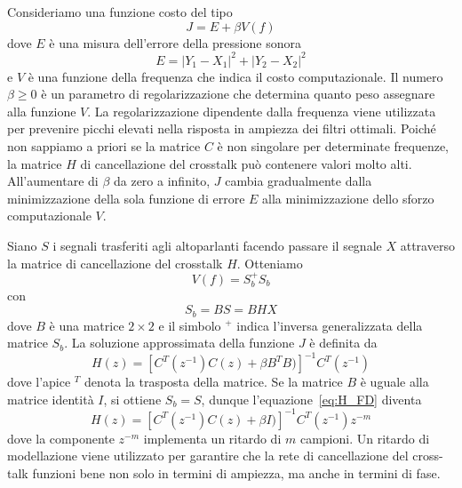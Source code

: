 \documentclass[12pt,a4paper,titlepage]{article}
\begin{document}
Consideriamo una funzione costo del tipo
\begin{equation}\label{funzione_costo_fd}
J = E + \beta V(f)
\end{equation}
dove $E$ è una misura dell'errore della pressione sonora
\begin{equation}\label{errore_fd}
E = | Y_1 - X_1 |^2  + | Y_2 - X_2 |^2
\end{equation}
e $V$ è una funzione della frequenza che indica il costo computazionale. Il numero $\beta \geq 0$ è un parametro di regolarizzazione che determina quanto peso
assegnare alla funzione $V$. La regolarizzazione dipendente dalla frequenza viene utilizzata per prevenire picchi elevati nella risposta in ampiezza dei filtri ottimali. Poiché non sappiamo a priori se la matrice $C$ è non singolare per determinate frequenze, la matrice $H$ di cancellazione del crosstalk può contenere valori molto alti. All'aumentare di $\beta$ da zero a infinito, $J$ cambia gradualmente dalla minimizzazione della sola funzione di errore $E$ alla minimizzazione dello sforzo computazionale $V$.

Siano $S$ i segnali trasferiti agli altoparlanti facendo passare il segnale $X$ attraverso la matrice di cancellazione del crosstalk $H$. Otteniamo
\begin{equation}
V(f) = S_b ^{+} S_b
\end{equation}
con
\begin{equation}
S_b = BS = BHX
\end{equation}
dove $B$ è una matrice $2 \times 2$ e il simbolo $^+$ indica l'inversa generalizzata della matrice $S_b$. La soluzione approssimata della funzione $J$ è definita da 
\begin{equation}\label{eq:H_FD}
H(z) = \left[C^T (z^{-1}) C(z) + \beta B^T B)\right]^{-1} C^T(z^{-1})
\end{equation}
dove l'apice $^T$ denota la trasposta della matrice. Se la matrice $B$ è uguale alla matrice identità $I$, si ottiene $S_b = S$, dunque l'equazione~\eqref{eq:H_FD} diventa
\begin{equation}\label{eq:H_FD2}
H(z) = \left[C^T (z^{-1}) C(z) + \beta I)\right]^{-1} C^T(z^{-1}) z^{-m}
\end{equation}
dove la componente $z^{-m}$ implementa un ritardo di $m$ campioni. Un ritardo di modellazione viene utilizzato per garantire che la rete di cancellazione del cross-talk funzioni bene non solo in termini di ampiezza, ma anche in termini di fase.
\end{document}
